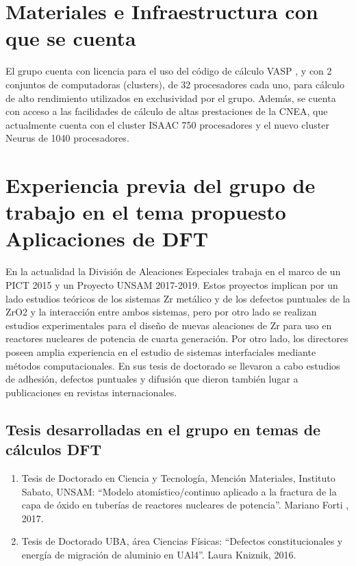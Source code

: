 \section{ Materiales e Infraestructura con que se cuenta }

El grupo cuenta con licencia para el uso del código de cálculo VASP\cite{Hafner2007,
Hafner2008} , y con 
2 conjuntos de computadoras (clusters), de 32 procesadores cada uno, para 
cálculo de alto rendimiento utilizados en exclusividad por el grupo. Además, se 
cuenta con acceso a las facilidades de cálculo de altas prestaciones de la CNEA, 
que actualmente cuenta con el cluster ISAAC 750 procesadores y el nuevo cluster 
Neurus de 1040 procesadores.

\section{Experiencia previa del grupo de trabajo en el tema propuesto Aplicaciones 
de DFT}

En la actualidad la División de Aleaciones Especiales trabaja en el marco de un 
PICT 2015 y un Proyecto UNSAM 2017-2019. Estos proyectos implican por un lado 
estudios teóricos de los sistemas Zr metálico y de los defectos puntuales de la 
ZrO2 y la interacción entre ambos sistemas, pero por otro lado se realizan 
estudios experimentales para el diseño de nuevas aleaciones de Zr para uso en 
reactores nucleares de potencia de cuarta generación. 
Por otro lado, los directores poseen amplia experiencia en el estudio de 
sistemas interfaciales mediante métodos computacionales. En sus tesis de 
doctorado se llevaron a cabo estudios de adhesión, defectos puntuales y 
difusión que dieron también lugar a publicaciones en revistas internacionales. 

\subsection{ Tesis desarrolladas en el grupo en temas de cálculos DFT}

\begin{enumerate}


\item Tesis de Doctorado en Ciencia y Tecnología, Mención Materiales, 
Instituto Sabato, UNSAM: “Modelo atomístico/continuo aplicado a la fractura de 
la capa de óxido en tuberías de reactores nucleares de potencia”. Mariano Forti 
, 2017.

\item Tesis de Doctorado UBA, área Ciencias Físicas: “Defectos 
constitucionales y energía de migración de aluminio en UAl4”. Laura Kniznik, 
2016. 

\end{enumerate}

